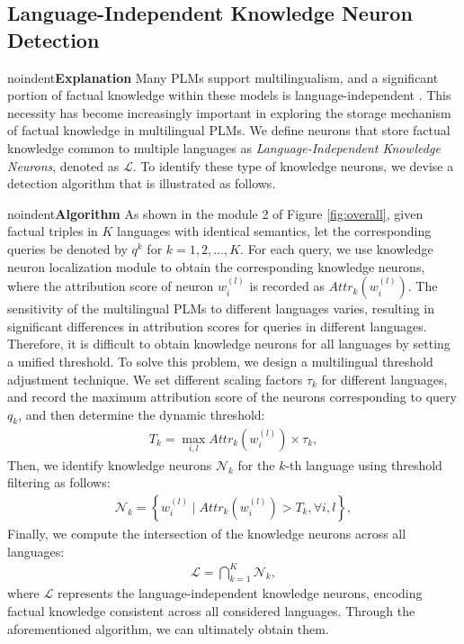 \documentclass[]{article}
\newcommand{\vpara}[1]{noindent\textbf{#1 }}%
\begin{document}
\subsection{Language-Independent Knowledge Neuron Detection}
\vpara{Explanation} Many PLMs support multilingualism, and a significant portion of factual knowledge within these models is language-independent \cite{m-language-edit, wang-etal-2020-negative}. This necessity has become increasingly important in exploring the storage mechanism of factual knowledge in multilingual PLMs. We define neurons that store factual knowledge common to multiple languages as \textit{Language-Independent Knowledge Neurons}, denoted as $\mathcal{L}$. To identify these type of knowledge neurons, we devise a detection algorithm that is illustrated as follows.

\vpara{Algorithm} As shown in the module 2 of Figure \ref{fig:overall}, given factual triples in $K$ languages with identical semantics, let the corresponding queries be denoted by $q^k$ for $k=1, 2, \ldots, K$. For each query, we use knowledge neuron localization module to obtain the corresponding knowledge neurons, where the attribution score of neuron $w_i^{(l)}$ is recorded as $Attr_k(w_i^{(l)})$. The sensitivity of the multilingual PLMs to different languages varies, resulting in significant differences in attribution scores for queries in different languages. Therefore, it is difficult to obtain knowledge neurons for all languages by setting a unified threshold. To solve this problem, we design a multilingual threshold adjustment technique. We set different scaling factors $\tau_k$ for different languages, and record the maximum attribution score of the neurons corresponding to query $q_k$, and then determine the dynamic threshold:
{\small\begin{align}
    T_k = \max_{i, l} Attr_k(w_i^{(l)}) \times \tau_k,
\end{align}}Then, we identify knowledge neurons \(\mathcal{N}_k\) for the \(k\)-th language using threshold filtering as follows:
{\small\begin{align}
    \mathcal{N}_k = \left\{ w_i^{(l)} \mid  Attr_k(w_i^{(l)}) > T_k,  \forall i, l \right\},
\end{align}}Finally, we compute the intersection of the knowledge neurons across all languages:
{\small\begin{align}
    \mathcal{L} = \bigcap_{k=1}^{K} \mathcal{N}_k,
\end{align} }where $\mathcal{L}$ represents the language-independent knowledge neurons, encoding factual knowledge consistent across all considered languages. Through the aforementioned algorithm, we can ultimately obtain them.
\end{document}
